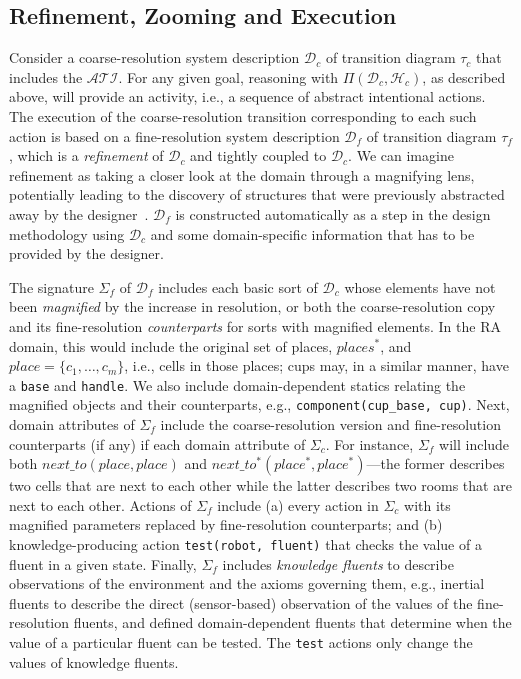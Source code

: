 \documentclass[letterpaper, 10 pt, conference]{ieeeconf}  %
\newcommand{\stt}[1]{{\small\texttt{#1}}}
\begin{document}
\subsection{Refinement, Zooming and Execution}
\label{sec:arch-refine-zoom}
Consider a coarse-resolution system description $\mathcal{D}_c$ of
transition diagram $\tau_c$ that includes the $\mathcal{ATI}$. For any
given goal, reasoning with $\Pi(\mathcal{D}_c, \mathcal{H}_c)$, as
described above, will provide an activity, i.e., a sequence of
abstract intentional actions. The execution of the coarse-resolution
transition corresponding to each such action is based on a
fine-resolution system description $\mathcal{D}_f$ of transition
diagram $\tau_f$, which is a \emph{refinement} of $\mathcal{D}_c$ and
tightly coupled to $\mathcal{D}_c$. We can imagine refinement as
taking a closer look at the domain through a magnifying lens,
potentially leading to the discovery of structures that were
previously abstracted away by the
designer~\cite{sridharan2017refinement}. $\mathcal{D}_f$ is
constructed automatically as a step in the design methodology using
$\mathcal{D}_c$ and some domain-specific information that has to be
provided by the designer.

The signature $\Sigma_f$ of $\mathcal{D}_f$ includes each basic sort
of $\mathcal{D}_c$ whose elements have not been \emph{magnified} by
the increase in resolution, or both the coarse-resolution copy and its
fine-resolution \emph{counterparts} for sorts with magnified elements.
In the RA domain, this would include the original set of places,
$places^*$, and $place=\{c_1,\dots,c_m\}$, i.e., cells in those
places; cups may, in a similar manner, have a \stt{base} and
\stt{handle}. We also include domain-dependent statics relating the
magnified objects and their counterparts, e.g.,
\stt{component(cup\_base, cup)}. Next, domain attributes of $\Sigma_f$
include the coarse-resolution version and fine-resolution counterparts
(if any) if each domain attribute of $\Sigma_c$. For instance,
$\Sigma_f$ will include both $next\_to(place, place)$ and
$next\_to^*(place^*, place^*)$---the former describes two cells that
are next to each other while the latter describes two rooms that are
next to each other. Actions of $\Sigma_f$ include (a) every action in
$\Sigma_c$ with its magnified parameters replaced by fine-resolution
counterparts; and (b) knowledge-producing action \stt{test(robot,
  fluent)} that checks the value of a fluent in a given state.
Finally, $\Sigma_f$ includes \emph{knowledge fluents} to describe
observations of the environment and the axioms governing them, e.g.,
inertial fluents to describe the direct (sensor-based) observation of
the values of the fine-resolution fluents, and defined
domain-dependent fluents that determine when the value of a particular
fluent can be tested. The \stt{test} actions only change the values of
knowledge fluents.
\end{document}
